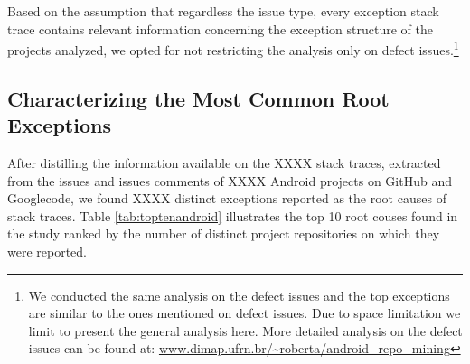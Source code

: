 \documentclass[conference]{IEEEtran}
\begin{document}
Based on the assumption that regardless the issue type, every exception stack
trace contains relevant information concerning the exception structure of the
projects analyzed, we opted for not restricting the analysis only on defect
issues.\footnote{We conducted the same analysis on the defect issues and the top
exceptions are similar to the ones mentioned on defect issues. Due to space
limitation we limit to present the general analysis here. More detailed analysis
on the defect issues can be found at:
\url{www.dimap.ufrn.br/~roberta/android_repo_mining}}

\subsection{Characterizing the Most Common Root Exceptions}

After distilling the information available on the XXXX  stack traces, extracted from the 
issues and issues comments of XXXX Android projects on GitHub and Googlecode,  
we found XXXX  distinct exceptions reported as the root causes of stack traces.
Table \ref{tab:toptenandroid} illustrates the top 10 root couses found in the study ranked by the number of distinct
project repositories on which they were reported. 
\end{document}
